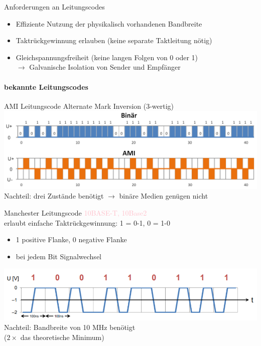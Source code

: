 \begin{KR}{Anforderungen an Leitungscodes}
\begin{itemize}
    \item Effiziente Nutzung der physikalisch vorhandenen Bandbreite
    \item Taktrückgewinnung erlauben (keine separate Taktleitung nötig)
    \item Gleichspannungsfreiheit (keine langen Folgen von 0 oder 1) \\ $\rightarrow$ Galvanische Isolation von Sender und Empfänger
\end{itemize} 
\end{KR}

\paragraph{bekannte Leitungscodes}

\begin{concept}{AMI Leitungscode} Alternate Mark Inversion (3-wertig)\\
    \includegraphics[width=0.7\linewidth]{images/gleichspannungsfreiheit.png}\\
    Nachteil: drei Zustände benötigt $\rightarrow$ binäre Medien genügen nicht
\end{concept}

\begin{concept}{Manchester Leitungscode} \textcolor{pink}{10BASE-T, 10Base2}\\
    erlaubt einfache Taktrückgewinnung: 1 = 0-1, 0 = 1-0
    \begin{itemize}
        \item 1 positive Flanke, 0 negative Flanke
        \item bei jedem Bit Signalwechsel
    \end{itemize}
    \includegraphics[width=0.6\linewidth]{images/leitungscode.png}\\
    Nachteil: Bandbreite von 10 MHz benötigt \\ ($2 \times$ das theoretische Minimum)
\end{concept}

